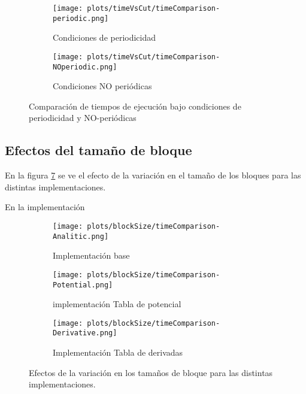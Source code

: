 

\begin{figure}[htbp]
\centering
\begin{subfigure}[b]{\plotwidthtres}
   \texttt{[image: plots/timeVsCut/timeComparison-periodic.png]}
   \caption{Condiciones de periodicidad}
   \label{compar-1iter}
 \end{subfigure}
\begin{subfigure}[b]{\plotwidthtres}
   \texttt{[image: plots/timeVsCut/timeComparison-NOperiodic.png]}
   \caption{Condiciones NO periódicas}
   \label{compar-niter}
 \end{subfigure}
 \caption{Comparaci\'on de tiempos de ejecuci\'on bajo condiciones de periodicidad y NO-periódicas}
 \label{time-vs-cut}
\end{figure}


\subsection{Efectos del tamaño de bloque}

En la figura \ref{blockSize} se ve el efecto de la variación en el tamaño de los bloques para las distintas implementaciones.

En la implementación

\begin{figure}[htbp]
\centering
\begin{subfigure}[b]{\plotwidthtres}
   \texttt{[image: plots/blockSize/timeComparison-Analitic.png]}
   \caption{Implementación base}
   \label{fig:cpu-scalability-caroteno}
 \end{subfigure}
\begin{subfigure}[b]{\plotwidthtres}
   \texttt{[image: plots/blockSize/timeComparison-Potential.png]}
   \caption{implementación Tabla de potencial}
   \label{fig:cpu-scalability-fullereno}
 \end{subfigure}
\begin{subfigure}[b]{\plotwidthtres}
   \texttt{[image: plots/blockSize/timeComparison-Derivative.png]}
   \caption{Implementación Tabla de derivadas}
   \label{fig:cpu-scalability-hemo}
 \end{subfigure}
 \caption{Efectos de la variación en los tamaños de bloque para las distintas implementaciones.}
 \label{blockSize}
\end{figure}


